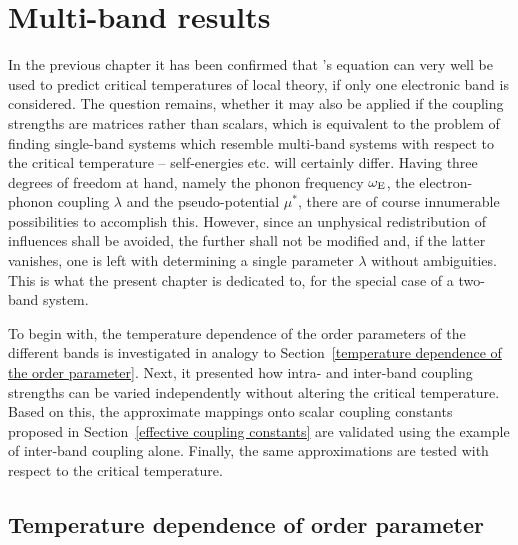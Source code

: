 
\chapter{Multi-band results}

In the previous chapter it has been confirmed that 's equation
can very well be used to predict critical temperatures of local
 theory, if only one electronic band is considered. The
question remains, whether it may also be applied if the coupling strengths are
matrices rather than scalars, which is equivalent to the problem of finding
single-band systems which resemble multi-band systems with respect to the
critical temperature -- self-energies etc. will certainly differ. Having three
degrees of freedom at hand, namely the phonon frequency $\omega \sb{\text{E}}$, the
electron-phonon coupling $\lambda$ and the  pseudo-potential
$\mu^*$, there are of course innumerable possibilities to accomplish this.
However, since an unphysical redistribution of influences shall be avoided, the
further shall not be modified and, if the latter vanishes, one is left with
determining a single parameter $\lambda$ without ambiguities. This is what the
present chapter is dedicated to, for the special case of a two-band system.

To begin with, the temperature dependence of the order parameters of the
different bands is investigated in analogy to Section~\ref{temperature
dependence of the order parameter}. Next, it presented how intra- and inter-band
coupling strengths can be varied independently without altering the critical
temperature. Based on this, the approximate mappings onto scalar coupling
constants proposed in Section~\ref{effective coupling constants} are validated
using the example of inter-band coupling alone. Finally, the same approximations
are tested with respect to the critical temperature.

\section{Temperature dependence of order parameter}

